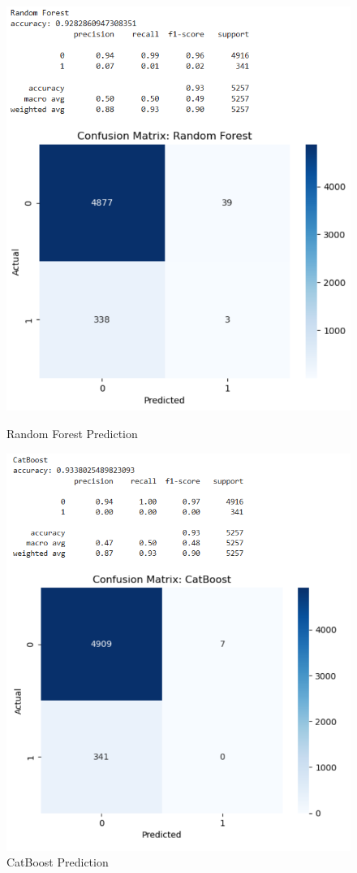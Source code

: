 \documentclass{article}
\begin{document}
\begin{figure}[h!]
	\begin{minipage}{0.48\textwidth}
		\centering
		\includegraphics[width=0.7\linewidth]{../Image/P11.jpg}
		\caption{Random Forest Prediction}
		\label{fig:P11}
	\end{minipage}\hfill
	\begin{minipage}{0.48\textwidth}
		\centering
		\includegraphics[width=0.7\linewidth]{../Image/P12.jpg}
		\caption{CatBoost Prediction}
		\label{fig:P12}
	\end{minipage}
\end{figure}
\end{document}
